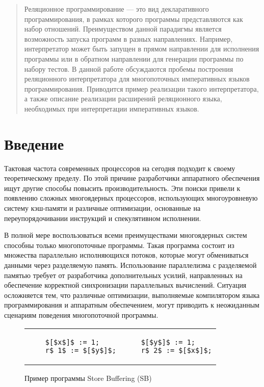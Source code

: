 \begin{abstract}
Реляционное программирование --- это вид декларативного программирования, 
в рамках которого программы представляются как набор отношений.
Преимуществом данной парадигмы является возможность запуска программ
в разных направлениях. 
Например, интерпретатор может быть запущен в прямом направлении для исполнения программы
или в обратном направлении для генерации программы по набору тестов.
В данной работе обсуждаются пробемы построения 
реляционного интерпретатора для многопоточных императивных языков программирования.
Приводится пример реализации такого интерпретатора, а также 
описание реализации расширений реляционного языка, 
необходимых при интерпретации императивных языков.

\end{abstract}

\section*{Введение}

Тактовая частота современных процессоров 
на сегодня подходит к своему теоретическому пределу. 
По этой причине разработчики аппаратного обеспечения 
ищут другие способы повысить производительность.
Эти поиски привели к появлению сложных многоядерных процессоров,
использующих многоуровневую систему кэш-памяти и 
различные оптимизации, основанные на переупорядочивании инструкций
и спекулятивном исполнении.

В полной мере воспользоваться всеми преимуществами многоядерных систем
способны только многопоточные программы.
Такая программа состоит из множества параллельно исполняющихся потоков,
которые могут обмениваться данными через разделяемую память.
Использование параллелизма с разделяемой памятью
требует от разработчика дополнительных усилий, 
направленных на обеспечение корректной синхронизации параллельных вычислений.
Ситуация осложняется тем, что различные оптимизации, 
выполняемые компилятором языка программирования и аппаратным обеспечением,
могут приводить к неожиданным сценариям поведения многопоточной программы.

\begin{figure}[htp]
\centering
    \begin{tabular}{l|@{\hskip 5pt}|@{\hskip -15pt}l}
    \begin{lstlisting}
    $[$x$]$ := 1;
    r$_1$ := $[$y$]$;
    \end{lstlisting}
    &
    \begin{lstlisting}
    $[$y$]$ := 1;
    r$_2$ := $[$x$]$;
    \end{lstlisting}
    \\
    \end{tabular}
    \caption{Пример программы Store Buffering (SB)}
    \label{lst:sb-ex-1}
\end{figure}

